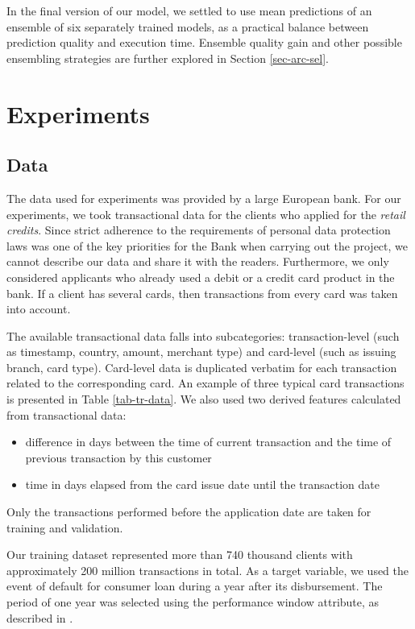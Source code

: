 \documentclass[sigconf]{acmart}
\begin{document}
In the final version of our model, we settled to use mean predictions of an ensemble of six separately trained models, as a practical balance between prediction quality and execution time. Ensemble quality gain and other possible ensembling strategies are further explored in Section \ref{sec-arc-sel}.

\section{Experiments} \label{sec-exp}
\subsection{Data} \label{sec-data}

The data used for experiments was provided by a large European bank. For our experiments, we took transactional data for the clients who applied for the \textit{retail credits}. Since strict adherence to the requirements of personal data protection laws was one of the key priorities for the Bank when carrying out the project, we cannot describe our data and share it with the readers.
Furthermore, we only considered applicants who already used a debit or a credit card product in the bank. If a client has several cards, then transactions from every card was taken into account.

The available transactional data falls into subcategories: trans\-action-level (such as timestamp, country, amount, merchant type) and card-level (such as issuing branch, card type). Card-level data is duplicated verbatim for each transaction related to the corresponding card. An example of three typical card transactions is presented in Table \ref{tab-tr-data}.
We also used two derived features calculated from transactional data:
\begin{itemize}
\item difference in days between the time of current transaction and the time of previous transaction by this customer
\item time in days elapsed from the card issue date until the transaction date
\end{itemize}
Only the transactions performed before the application date are taken for training and validation.

Our training dataset represented more than 740 thousand clients with approximately 200 million transactions in total. As a target variable, we used the event of default for consumer loan during a year after its disbursement. The period of one year was selected using the performance window attribute, as described in \cite{siddiqi2005credit}.
\end{document}
